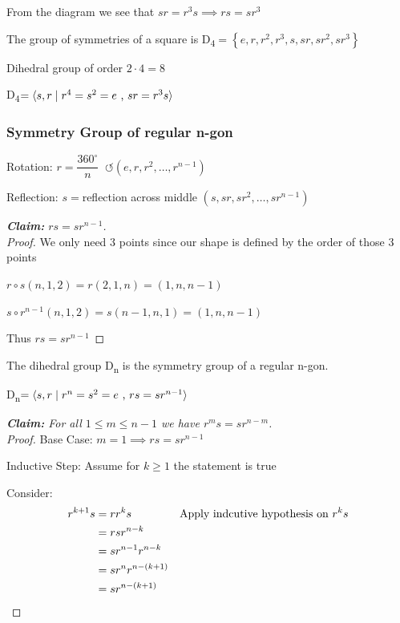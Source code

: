 From the diagram we see that \(sr=r^3s\implies rs=sr^3\)

\begin{definition}
    The group of symmetries of a square is D\textsubscript{4}\(=\left\{ e,r,r^2,r^3,s,sr,sr^2,sr^3 \right\}\)

    Dihedral group of order \(2\cdot4=8\)

    D\textsubscript{4}\(=\langle s,r \mid r^4=s^2=e \text{ , } sr=r^3s \rangle \)
\end{definition}

\subsubsection{Symmetry Group of regular n-gon}
\phantom{text}

Rotation: \(r=\dfrac{360^\circ}{n}\;\;\circlearrowleft \left( e,r,r^2,\ldots,r^{n-1} \right)\)
\vspace{5pt}

Reflection: \(s=\)reflection across middle \(\left( s,sr,sr^2,\ldots, sr^{n-1} \right)\)

\begin{proof}[\textbf{Claim:} \(rs=sr^{n-1}\)]
    \phantom{text}\\
    \textit{Proof.}
    We only need 3 points since our shape is defined by the order of those 3 points

    \(r\circ s\left( n,1,2 \right) = r\left( 2,1,n \right) = \left( 1,n,n-1 \right)\)
    
    \(s\circ r^{n-1}\left( n,1,2 \right) = s\left( n-1,n,1 \right) = \left( 1,n,n-1 \right)\)

    Thus \(rs=sr^{n-1}\)
\end{proof}

\begin{definition}
    The dihedral group D\textsubscript{n} is the symmetry group of a regular n-gon.

    D\textsubscript{n}\(=\langle s,r \mid r^n=s^2=e \text{ , } rs=sr^{n-1} \rangle \)
\end{definition}

\begin{proof}[\textbf{Claim:} For all \(1\leq m\leq n-1\) we have \(r^ms=sr^{n-m}\)]
    \phantom{text}\\
    \textit{Proof.} Base Case: \(m=1 \implies rs=sr^{n-1}\) \checkmark

    Inductive Step: Assume for \(k \geq 1\) the statement is true

    Consider: 
    \begin{align*}
        r^{k+1}s&=rr^ks &\text{Apply indcutive hypothesis on } r^ks\\
                &=rsr^{n-k} \\
                &=sr^{n-1}r^{n-k}\\
                &=sr^nr^{n-(k+1)}\\
                &=sr^{n-(k+1)}
    \end{align*}
\end{proof}
\newpage
